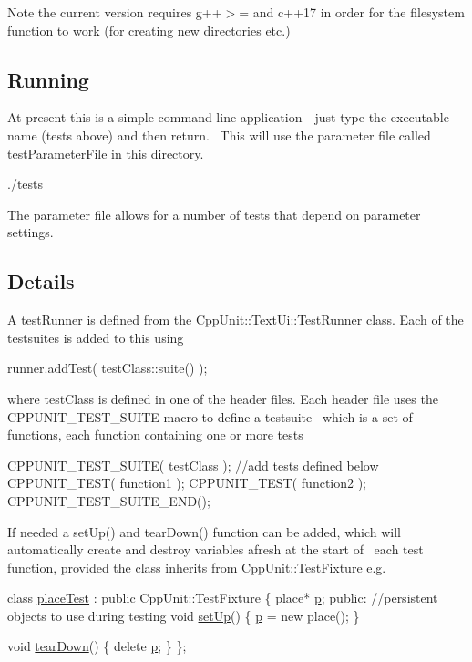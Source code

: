 Note the current version requires g++$>$= and c++17 in order for the filesystem function to work (for creating new directories etc.)~\newline
\hypertarget{index_Run}{}\subsection{Running}\label{index_Run}
At present this is a simple command-\/line application -\/ just type the executable name (tests above) and then return.~\newline
This will use the parameter file called test\+Parameter\+File in this directory. ~\newline

\begin{DoxyCode}
./tests
\end{DoxyCode}
 The parameter file allows for a number of tests that depend on parameter settings. \hypertarget{index_Details}{}\subsection{Details}\label{index_Details}
A test\+Runner is defined from the Cpp\+Unit\+::\+Text\+Ui\+::\+Test\+Runner class. Each of the testsuites is added to this using 
\begin{DoxyCode}
runner.addTest( testClass::suite() );
\end{DoxyCode}
 where test\+Class is defined in one of the header files. Each header file uses the C\+P\+P\+U\+N\+I\+T\+\_\+\+T\+E\+S\+T\+\_\+\+S\+U\+I\+TE macro to define a testsuite~\newline
which is a set of functions, each function containing one or more tests 
\begin{DoxyCode}
 CPPUNIT\_TEST\_SUITE( testClass );
\textcolor{comment}{//add tests defined below}
CPPUNIT\_TEST( function1 );
CPPUNIT\_TEST( function2 );
CPPUNIT\_TEST\_SUITE\_END();
\end{DoxyCode}
 If needed a set\+Up() and tear\+Down() function can be added, which will automatically create and destroy variables afresh at the start of~\newline
each test function, provided the class inherits from Cpp\+Unit\+::\+Test\+Fixture e.\+g. 
\begin{DoxyCode}
\textcolor{keyword}{class }\mbox{\hyperlink{classplaceTest}{placeTest}} : \textcolor{keyword}{public} CppUnit::TestFixture  \{
  place* \mbox{\hyperlink{classplaceTest_a0f4e660bdadc034488490bbadc33e09f}{p}};
\textcolor{keyword}{public}:
 \textcolor{comment}{//persistent objects to use during testing}
 \textcolor{keywordtype}{void} \mbox{\hyperlink{classplaceTest_a1818bbe31325c6d9344b35f3b510cacf}{setUp}}()
 \{
     \mbox{\hyperlink{classplaceTest_a0f4e660bdadc034488490bbadc33e09f}{p}} = \textcolor{keyword}{new} place();
 \}
 
 \textcolor{keywordtype}{void} \mbox{\hyperlink{classplaceTest_a2a0d52566e44cc385dc8fecdae504d6f}{tearDown}}() 
 \{
     \textcolor{keyword}{delete} \mbox{\hyperlink{classplaceTest_a0f4e660bdadc034488490bbadc33e09f}{p}};
 \}
 \};
\end{DoxyCode}
